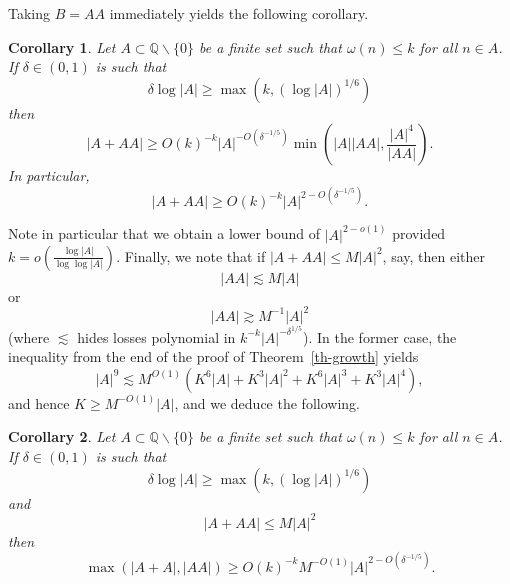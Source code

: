 \documentclass{amsart}
\renewcommand{\leq}{\leqslant}
\renewcommand{\geq}{\geqslant}
\newcommand{\bbq}{\mathbb{Q}}
\newcommand{\ls}{\lesssim}
\newcommand{\abs}[1]{\left\lvert #1\right\rvert}
\newcommand{\brac}[1]{\left( #1\right)}
\newtheorem{corollary}{Corollary}
\theoremstyle{definition}
\begin{document}
Taking $B=AA$ immediately yields the following corollary.

\begin{corollary}\label{cor-main3precise}
Let $A\subset \bbq\backslash\{0\}$ be a finite set such that $\omega(n)\leq k$ for all $n\in A$. If $\delta\in (0,1)$ is such that
\[\delta \log \abs{A} \geq \max(k,(\log \abs{A})^{1/6})\]
then
\[\abs{A+AA}\geq O(k)^{-k}\abs{A}^{-O(\delta^{-1/5})}\min\brac{\abs{A}\abs{AA}, \frac{\abs{A}^4}{\abs{AA}}}.\]
In particular, 
\[\abs{A+AA}\geq O(k)^{-k}\abs{A}^{2-O(\delta^{-1/5})}.\]
\end{corollary}
Note in particular that we obtain a lower bound of $\abs{A}^{2-o(1)}$ provided $k=o(\frac{\log \abs{A}}{\log\log \abs{A}})$. Finally, we note that if $\abs{A+AA}\leq M\abs{A}^2$, say, then either
\[\abs{AA}\ls M\abs{A}\]
or 
\[\abs{AA}\gtrsim M^{-1}\abs{A}^2\]
(where $\ls$ hides losses polynomial in $k^{-k}\abs{A}^{-\delta^{1/5}}$). In the former case, the inequality from the end of the proof of Theorem~\ref{th-growth} yields
\[\abs{A}^9\ls M^{O(1)}\brac{K^6\abs{A}+K^3\abs{A}^2+K^6\abs{A}^3+K^3\abs{A}^4},\]
and hence $K \geq M^{-O(1)}\abs{A}$, and we deduce the following.
\begin{corollary}
Let $A\subset \bbq\backslash\{0\}$ be a finite set such that $\omega(n)\leq k$ for all $n\in A$. If $\delta\in (0,1)$ is such that
\[\delta \log \abs{A} \geq \max(k,(\log \abs{A})^{1/6})\]
and 
\[\abs{A+AA}\leq M\abs{A}^2\]
then
\[\max(\abs{A+A},\abs{AA})\geq O(k)^{-k}M^{-O(1)}\abs{A}^{2-O(\delta^{-1/5})}.\]
\end{corollary}


 
\end{document}
